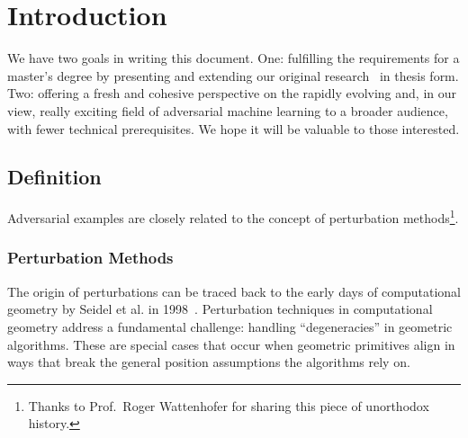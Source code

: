 \documentclass[a4paper, oneside]{discothesis}
\begin{document}
\tableofcontents

\mainmatter

\chapter{Introduction}

We have two goals in writing this document. One: fulfilling the requirements for a master's degree by presenting and extending our original research~\cite{jabary2024seeing} in thesis form. Two: offering a fresh and cohesive perspective on the rapidly evolving and, in our view, really exciting field of adversarial machine learning to a broader audience, with fewer technical prerequisites. We hope it will be valuable to those interested.

\section{Definition}

Adversarial examples are closely related to the concept of perturbation methods\footnote{Thanks to Prof.\ Roger Wattenhofer for sharing this piece of unorthodox history.}.

\subsection{Perturbation Methods}

The origin of perturbations can be traced back to the early days of computational geometry by Seidel et al. in 1998~\cite{seidel1998nature}. Perturbation techniques in computational geometry address a fundamental challenge: handling ``degeneracies'' in geometric algorithms. These are special cases that occur when geometric primitives align in ways that break the general position assumptions the algorithms rely on.
\end{document}
